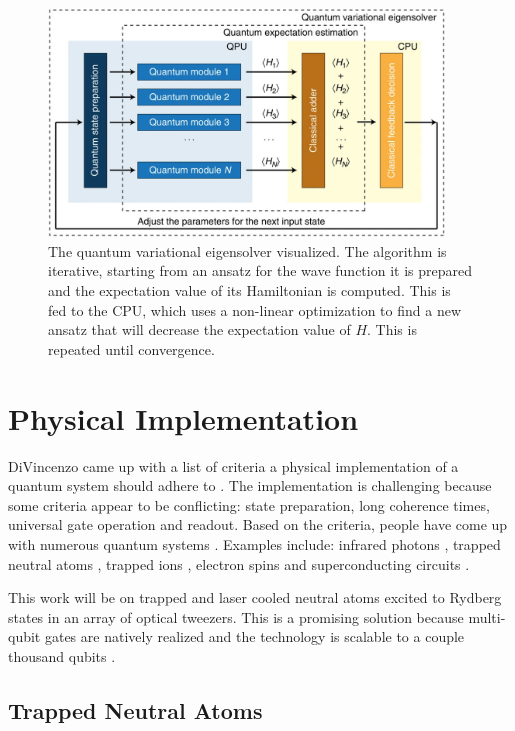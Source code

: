 \begin{figure}
	\centering
	\includegraphics[width=10.5cm]{figures/vqe.png}
	\caption{The quantum variational eigensolver visualized. The algorithm is iterative, starting from an ansatz for the wave function it is prepared and the expectation value of its Hamiltonian is computed. This is fed to the CPU, which uses a non-linear optimization to find a new ansatz that will decrease the expectation value of $H$. This is repeated until convergence. \cite{Peruzzo2014}}
	\label{fig:VQE}
\end{figure}


\section{Physical Implementation}

DiVincenzo came up with a list of criteria a physical implementation of a quantum system should adhere to \cite{DiVincenzo2000}. The implementation is challenging because some criteria appear to be conflicting: state preparation, long coherence times, universal gate operation and readout. Based on the criteria, people have come up with numerous quantum systems \cite{Ladd2010}. Examples include: infrared photons \cite{Matthews2009}, trapped neutral atoms \cite{Treutlein2004}, trapped ions \cite{Benhelm2008}, electron spins \cite{Press2008} and superconducting circuits \cite{Arute2019,DiCarlo2009}.

This work will be on trapped and laser cooled neutral atoms excited to Rydberg states in an array of optical tweezers. This is a promising solution because multi-qubit gates are natively realized and the technology is scalable to a couple thousand qubits \cite{Henriet2020}.

\subsection{Trapped Neutral Atoms}


